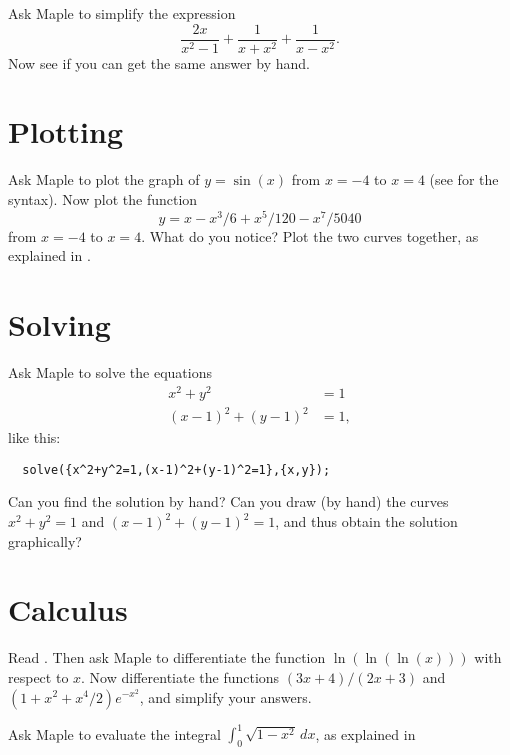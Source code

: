 \documentclass[a4paper,10pt]{amsbook}
\numberwithin{example}{chapter}
\begin{document}
\begin{exercise}\label{ex-rat-misc}
 Ask Maple to simplify the expression 
 \[ \frac{2x}{x^2-1} + \frac{1}{x+x^2} + \frac{1}{x-x^2}. \]
 Now see if you can get the same answer by hand. 
\end{exercise}

\section{Plotting}

\begin{exercise}\label{ex-sin-taylor}
 Ask Maple to plot the graph of $y=\sin(x)$ from $x=-4$ to
 $x=4$ (see \note{\NOTEbasicplot} for the syntax).  Now plot
 the function
 \[ y = x-x^3/6+x^5/120-x^7/5040 \]
 from $x=-4$ to $x=4$.  What do you notice?  Plot the two curves
 together, as explained in \note{\NOTEtwoplots}.
\end{exercise}

\section{Solving}

\begin{exercise}
 Ask Maple to solve the equations 
 \begin{align*}
  x^2 + y^2 &= 1 \\
  (x-1)^2 + (y-1)^2 &= 1,
 \end{align*}
 like this:
\begin{verbatim}
  solve({x^2+y^2=1,(x-1)^2+(y-1)^2=1},{x,y});
\end{verbatim}
 Can you find the solution by hand?  Can you draw (by hand)
 the curves $x^2+y^2=1$ and $(x-1)^2+(y-1)^2=1$, and thus
 obtain the solution graphically?
\end{exercise}

\section{Calculus}

\begin{exercise}
 Read \note{\NOTEdiff,\NOTEdiffvar}.  Then ask Maple to
 differentiate the function $\ln(\ln(\ln(x)))$ with respect
 to $x$.  Now differentiate the functions $(3x+4)/(2x+3)$
 and $(1+x^2+x^4/2)e^{-x^2}$, and simplify your answers.
\end{exercise}

\begin{exercise}
 Ask Maple to evaluate the integral
 $\int_0^1\sqrt{1-x^2}\,dx$, as explained in \note{\NOTEdefint}
\end{exercise}
\end{document}
